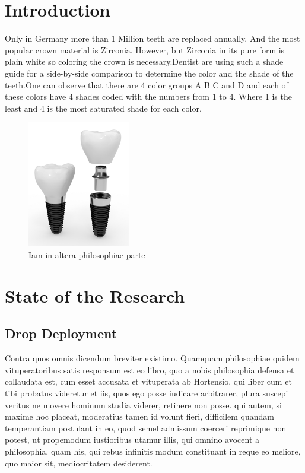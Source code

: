 \cleardoublepage
{}


\chapter{Introduction}
\label{sec:problemstellung}
 Only in Germany more than 1 Million teeth are replaced annually.
 And the most popular crown material is Zirconia. However, but Zirconia in its pure form is plain white so coloring the crown is necessary.Dentist are using such a shade guide for a side-by-side comparison to determine the color and the shade of the teeth.One can observe that there are 4 color groups A B C and D and each of these colors have 4 shades coded with the numbers from 1 to 4. Where 1 is the least and 4 is the most saturated shade for each color. 
 
 \begin{figure}[h]
 	\centering
 	\includegraphics[width=0.4\textwidth]{grafiken/implant.png}
 	\caption{Iam in altera philosophiae parte}
 	\label{fig:bild1}
 \end{figure}

\chapter{State of the Research}
\label{sec:stand_forschung}

\section{Drop Deployment}
Contra quos omnis dicendum breviter existimo. Quamquam philosophiae quidem vituperatoribus satis responsum est eo libro, quo a nobis philosophia defensa et collaudata est, cum esset accusata et vituperata ab Hortensio. qui liber cum et tibi probatus videretur et iis, quos ego posse iudicare arbitrarer, plura suscepi veritus ne movere hominum studia viderer, retinere non posse. \citet{autor1} qui autem, si maxime hoc placeat, moderatius tamen id volunt fieri, difficilem quandam temperantiam postulant in eo, quod semel admissum coerceri reprimique non potest, ut propemodum iustioribus utamur illis, qui omnino avocent a philosophia, quam his, qui rebus infinitis modum constituant in reque eo meliore, quo maior sit, mediocritatem desiderent. \citep{autor2}

